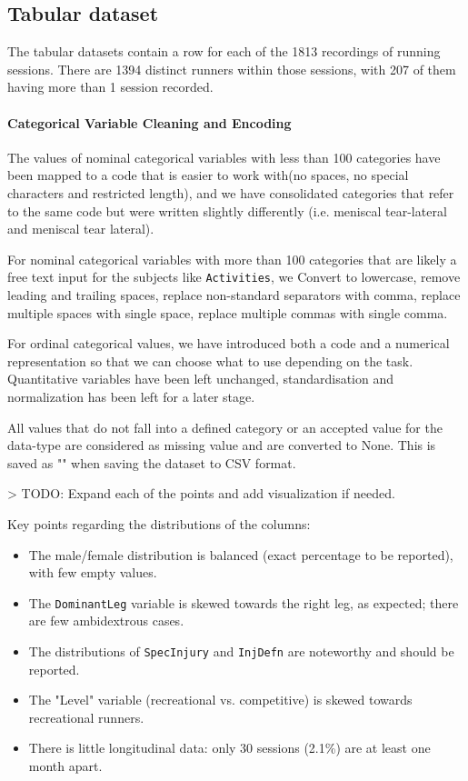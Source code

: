 \subsection{Tabular dataset}\label{subsec:method-tabular-dataset}
The tabular datasets contain a row for each of the 1813 recordings of running sessions. There are 1394 distinct runners within those sessions, with 207 of them having more than 1 session recorded.

\paragraph{Categorical Variable Cleaning and Encoding}
The values of nominal categorical variables with less than 100 categories have been mapped to a code that is easier to work with(no spaces, no special characters and restricted length), and we have consolidated categories that refer to the same code but were written slightly differently (i.e. meniscal tear-lateral and meniscal tear lateral).

For nominal categorical variables with more than 100 categories that are likely a free text input for the subjects like \texttt{Activities}, we Convert to lowercase, remove leading and trailing spaces, replace non-standard separators with comma, replace multiple spaces with single space, replace multiple commas with single comma.

For ordinal categorical values, we have introduced both a code and a numerical representation so that we can choose what to use depending on the task.
Quantitative variables have been left unchanged, standardisation and normalization has been left for a later stage.

All values that do not fall into a defined category or an accepted value for the data-type are considered as missing value and are converted to None. This is saved as "" when saving the dataset to CSV format.

> TODO: Expand each of the points and add visualization if needed.

Key points regarding the distributions of the columns:
\begin{itemize}
    \item The male/female distribution is balanced (exact percentage to be reported), with few empty values.
    \item The \texttt{DominantLeg} variable is skewed towards the right leg, as expected; there are few ambidextrous cases.
    \item The distributions of \texttt{SpecInjury} and \texttt{InjDefn} are noteworthy and should be reported.
    \item The "Level" variable (recreational vs. competitive) is skewed towards recreational runners.
    \item There is little longitudinal data: only 30 sessions (2.1\%) are at least one month apart.
\end{itemize}

